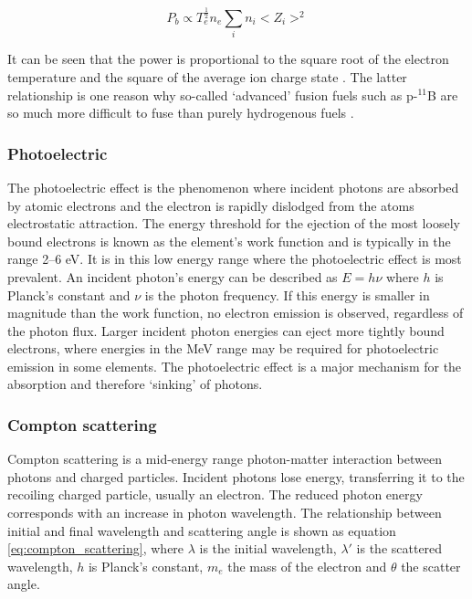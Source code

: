 \begin{equation}
  \label{eq:bremsstrahlung}
  P_{b} \propto T_{e}^{\frac{1}{2}} n_{e} \sum_{i} n_{i} <Z_{i}>^{2}
\end{equation}

It can be seen that the power is proportional to the square root of the electron temperature and the square of the average ion charge state \cite{schuster2017}. The latter relationship is one reason why so-called `advanced' fusion fuels such as p-$^{11}$B are so much more difficult to fuse than purely hydrogenous fuels \cite{rider1995}.

\subsubsection{Photoelectric}
The photoelectric effect is the phenomenon where incident photons are absorbed by atomic electrons and the electron is rapidly dislodged from the atoms electrostatic attraction. The energy threshold for the ejection of the most loosely bound electrons is known as the element's work function and is typically in the range 2--6 eV. It is in this low energy range where the photoelectric effect is most prevalent. An incident photon's energy can be described as $E=h\nu$ where $h$ is Planck's constant and $\nu$ is the photon frequency. If this energy is smaller in magnitude than the work function, no electron emission is observed, regardless of the photon flux. Larger incident photon energies can eject more tightly bound electrons, where energies in the MeV range may be required for photoelectric emission in some elements. The photoelectric effect is a major mechanism for the absorption and therefore `sinking' of photons.

\subsubsection{Compton scattering}
\label{subsubsec:compton}
Compton scattering is a mid-energy range photon-matter interaction between photons and charged particles. Incident photons lose energy, transferring it to the recoiling charged particle, usually an electron. The reduced photon energy corresponds with an increase in photon wavelength. The relationship between initial and final wavelength and scattering angle is shown as equation \ref{eq:compton_scattering}, where $\lambda$ is the initial wavelength, $\lambda'$ is the scattered wavelength, $h$ is Planck's constant, $m_{e}$ the mass of the electron and $\theta$ the scatter angle.

